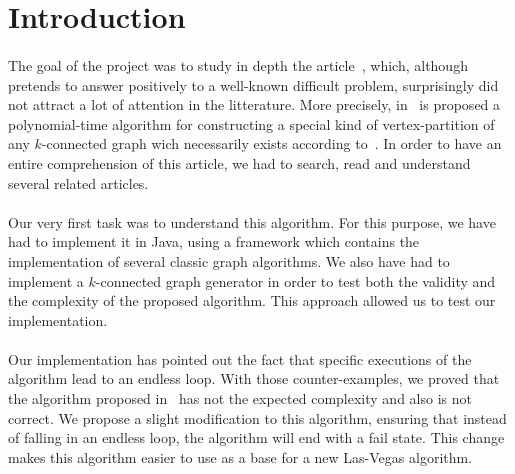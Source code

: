 \section{Introduction}
\paragraph{}
The goal of the project was to study in depth the article~\cite{JS94}, which,
although pretends to answer positively to a well-known difficult problem,
surprisingly did not attract a lot of attention in the litterature.
More precisely, in~\cite{JS94} is proposed a polynomial-time algorithm for
constructing a special kind of vertex-partition of any $k$-connected graph wich 
necessarily exists according to~\cite{GE78,LL77}. %
In order to have an entire comprehension of this article, we had to search,
read and understand several related articles.

\paragraph{}
Our very first task was to understand this algorithm. For this purpose, we have 
had to implement it in Java, using a framework which contains the implementation
of several classic graph algorithms.
We also have had to implement a $k$-connected graph generator in order to test both
the validity and the complexity of the proposed algorithm. This approach allowed
us to test our implementation.

\paragraph{}
Our implementation has pointed out the fact that specific executions of the
algorithm lead to an endless loop. With those counter-examples, we
proved that the algorithm proposed in~\cite{JS94} has not the expected
complexity and also is not correct.
We propose a slight modification to this algorithm, ensuring that instead of
falling in an endless loop, the algorithm will end with a fail state. This
change makes this algorithm easier to use as a base for a new Las-Vegas
algorithm.
